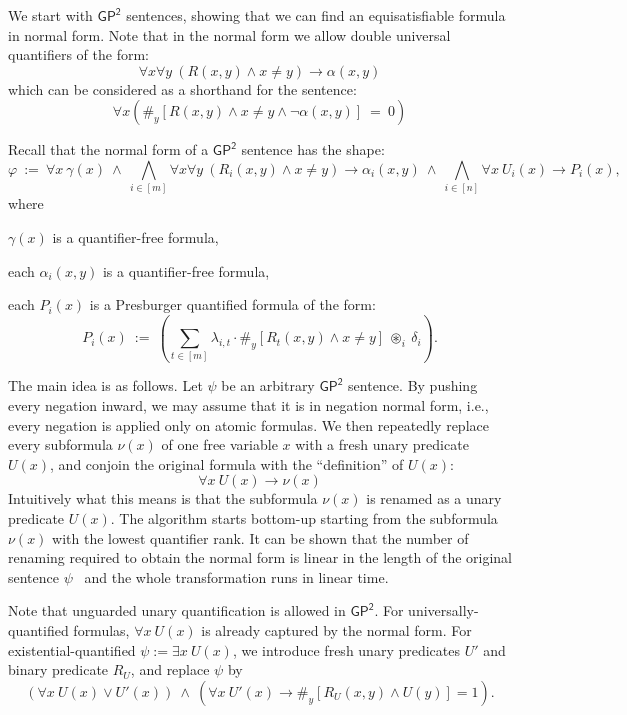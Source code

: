 \documentclass[10pt,a4paper]{article}
\theoremstyle{definition}
\theoremstyle{remark}
\newcommand{\GPtwo}   {\mathsf{GP^2}}
\newcommand{\presby}[1]  {{\#_y\left[ #1 \right]}}
\newcommand{\intsinterval}[1]{{\left[ #1 \right]}}
\begin{document}
We start with $\GPtwo$ sentences, showing that we can find an equisatisfiable formula in normal form.
Note that in the normal form we allow double universal quantifiers of the form:
$$
\forall x \forall y\ \left(R(x,y) \land x \neq y\right) \to \alpha(x, y)
$$
which can be considered as a shorthand for the  sentence:
$$
\forall x 
\left(
\presby{R(x, y) \land x \neq y\land \neg \alpha(x,y)}
\ =\ 0 
\right)
$$

Recall that the normal form of a $\GPtwo$ sentence has the shape:
\begin{equation*}
    \varphi\ :=\ 
    \forall x\ \gamma(x)\ \land\ 
    \bigwedge_{i \in \intsinterval{m}} \forall x \forall y\ \left(R_i(x,y) \land x \neq y\right) \to \alpha_i(x, y)\ \land\ 
    \bigwedge_{i \in \intsinterval{n}} \forall x\ U_i(x) \to P_i(x),
\end{equation*}
where
\begin{compactitem}
    \item $\gamma(x)$ is a quantifier-free formula,
    \item each $\alpha_i(x, y)$ is a quantifier-free formula,
    \item each $P_i(x)$ is a Presburger quantified formula of the form: 
    \begin{equation*}
        P_i(x)\ :=\ \left(
        \sum_{t \in \intsinterval{m}} \lambda_{i, t} \cdot \presby{R_t(x, y) \land x \neq y}
        \ \circledast_i\ \delta_i \right).
    \end{equation*}
\end{compactitem}

The main idea is as follows.
Let $\psi$ be an arbitrary $\GPtwo$ sentence.
By pushing every negation inward, we may assume that it is in negation normal form,
i.e., every negation is applied only on atomic formulas.
We then repeatedly replace every subformula $\nu(x)$ of one free variable $x$ with a fresh unary predicate $U(x)$, and conjoin the original formula with the ``definition'' of $U(x)$:
$$
\forall x \ U(x) \to \nu(x)
$$
Intuitively what this means is that
the subformula $\nu(x)$ is renamed as a unary predicate $U(x)$.
The algorithm starts bottom-up starting from the subformula $\nu(x)$
with the lowest quantifier rank.
It can be shown that the number of renaming required to obtain the normal form is linear in the length of the original sentence $\psi$~\cite[Lemma 3.3]{twovarpres} and the whole transformation runs in linear time.

Note that unguarded unary quantification is allowed in $\GPtwo$.
For universally-quantified formulas, $\forall x\ U(x)$ is already captured by the normal form.
For existential-quantified $\psi := \exists x\ U(x)$,
we introduce fresh unary predicates $U'$ and binary predicate $R_U$, and replace $\psi$ by 
\begin{equation*}
    \left(
        \forall x\ U(x) \lor U'(x)
    \right)
    \ \land\ 
    \left(
        \forall x\ U'(x) \to \presby{R_U(x, y) \land U(y)} = 1
    \right).
\end{equation*}
\end{document}
